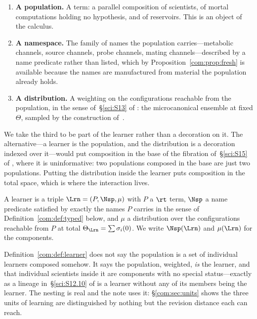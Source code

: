 \begin{enumerate}[label=(\roman*)]
\item \textbf{A population.} A term: a parallel composition of scientists, of mortal
computations holding no hypothesis, and of reservoirs. This is an object of the calculus.
\item \textbf{A namespace.} The family of names the population carries---metabolic channels,
source channels, probe channels, mating channels---described by a name predicate rather than
listed, which by Proposition~\ref{com:prop:fresh} is available because the names are manufactured
from material the population already holds.
\item \textbf{A distribution.} A weighting on the configurations reachable from the population,
in the sense of~\S\ref{sci:S13} of \chSci: the microcanonical ensemble at fixed $\Theta$, sampled by
the construction of~\cite{StochSim}.
\end{enumerate}

We take the third to be part of the learner rather than a decoration on it. The alternative---a
learner is the population, and the distribution is a decoration indexed over it---would put
composition in the base of the fibration of~\S\ref{sci:S15} of \chSci, where it is uninformative:
two populations composed in the base are just two populations. Putting the distribution inside
the learner puts composition in the total space, which is where the interaction lives.

\begin{definition}[Learner]\label{com:def:learner}
A learner is a triple $\Lrn = (P, \Nsp, \mu)$ with $P$ a $\rt$ term, $\Nsp$ a name predicate
satisfied by exactly the names $P$ carries in the sense of Definition~\ref{com:def:typed} below, and
$\mu$ a distribution over the configurations reachable from $P$ at total $\Theta_{\Lrn} =
\sum \sigma_i(0)$. We write $\Nsp(\Lrn)$ and $\mu(\Lrn)$ for the components.
\end{definition}

\begin{remark}\label{com:population-bag-learners}
Definition~\ref{com:def:learner} does not say the population is a set of individual learners composed
somehow. It says the population, weighted, \emph{is} the learner, and that individual scientists
inside it are components with no special status---exactly as a lineage in~\S\ref{sci:S12.10} of \chSci
is a learner without any of its members being the learner. The nesting is real and the note uses
it: \S\ref{com:sec:units} shows the three units of learning are distinguished by nothing but the
revision distance each can reach.
\end{remark}

